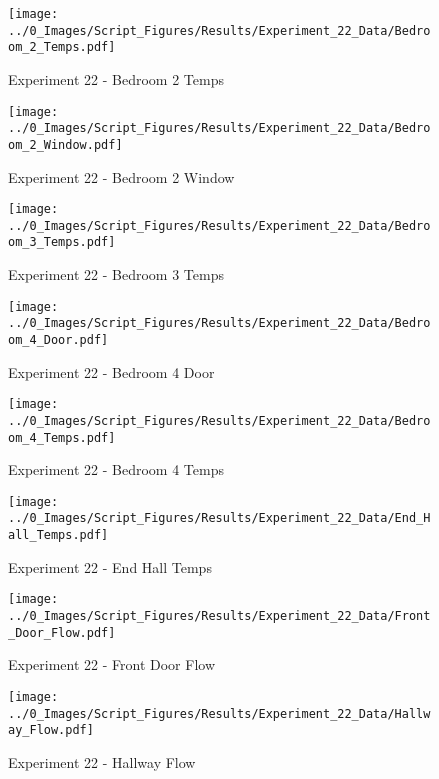 	\begin{figure}[H]
		\centering
		\texttt{[image: ../0\_Images/Script\_Figures/Results/Experiment\_22\_Data/Bedroom\_2\_Temps.pdf]}
		\caption[]{Experiment 22 - Bedroom 2 Temps}
	\end{figure}
 
	\clearpage

	\begin{figure}[H]
		\centering
		\texttt{[image: ../0\_Images/Script\_Figures/Results/Experiment\_22\_Data/Bedroom\_2\_Window.pdf]}
		\caption[]{Experiment 22 - Bedroom 2 Window}
	\end{figure}
 

	\begin{figure}[H]
		\centering
		\texttt{[image: ../0\_Images/Script\_Figures/Results/Experiment\_22\_Data/Bedroom\_3\_Temps.pdf]}
		\caption[]{Experiment 22 - Bedroom 3 Temps}
	\end{figure}
 
	\clearpage

	\begin{figure}[H]
		\centering
		\texttt{[image: ../0\_Images/Script\_Figures/Results/Experiment\_22\_Data/Bedroom\_4\_Door.pdf]}
		\caption[]{Experiment 22 - Bedroom 4 Door}
	\end{figure}
 

	\begin{figure}[H]
		\centering
		\texttt{[image: ../0\_Images/Script\_Figures/Results/Experiment\_22\_Data/Bedroom\_4\_Temps.pdf]}
		\caption[]{Experiment 22 - Bedroom 4 Temps}
	\end{figure}
 
	\clearpage

	\begin{figure}[H]
		\centering
		\texttt{[image: ../0\_Images/Script\_Figures/Results/Experiment\_22\_Data/End\_Hall\_Temps.pdf]}
		\caption[]{Experiment 22 - End Hall Temps}
	\end{figure}
 

	\begin{figure}[H]
		\centering
		\texttt{[image: ../0\_Images/Script\_Figures/Results/Experiment\_22\_Data/Front\_Door\_Flow.pdf]}
		\caption[]{Experiment 22 - Front Door Flow}
	\end{figure}
 
	\clearpage

	\begin{figure}[H]
		\centering
		\texttt{[image: ../0\_Images/Script\_Figures/Results/Experiment\_22\_Data/Hallway\_Flow.pdf]}
		\caption[]{Experiment 22 - Hallway Flow}
	\end{figure}
 

